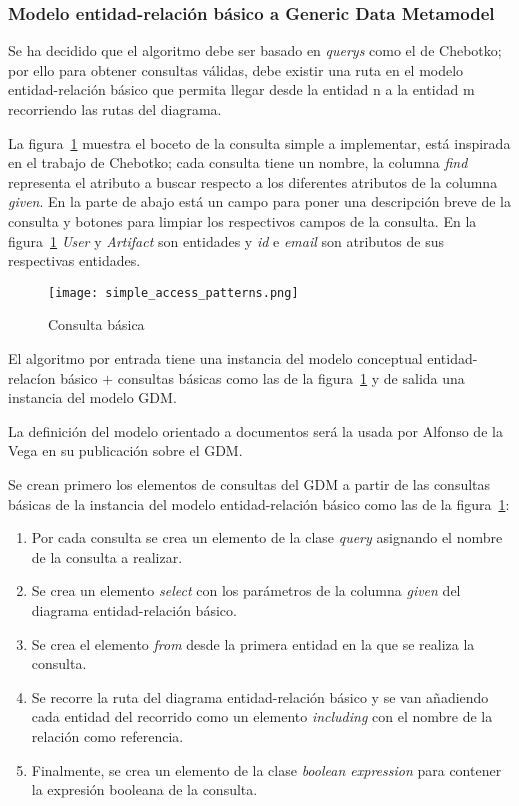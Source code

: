 \subsubsection{Modelo entidad-relación básico a Generic Data Metamodel}\label{sec:er-to-gdm}

Se ha decidido que el algoritmo debe ser basado en \textit{querys} como el de Chebotko; por ello para obtener consultas válidas, debe existir una ruta en el modelo entidad-relación básico que permita llegar desde la entidad n a la entidad m recorriendo las rutas del diagrama.


La figura~\ref{img:simple-access-pattern} muestra el boceto de la consulta simple a implementar, está inspirada en el trabajo de Chebotko; cada consulta tiene un nombre, la columna \textit{find} representa el atributo a buscar respecto a los diferentes atributos de la columna \textit{given}. En la parte de abajo está un campo para poner una descripción breve de la consulta y botones para limpiar los respectivos campos de la consulta. En la figura~\ref{img:simple-access-pattern} \textit{User} y \textit{Artifact} son entidades y \textit{id} e \textit{email} son atributos de sus respectivas entidades.


\begin{figure}[H] 
    \centering
    \texttt{[image: simple\_access\_patterns.png]}
    \caption{Consulta básica}
    \label{img:simple-access-pattern}
\end{figure}


El algoritmo por entrada tiene una instancia del modelo conceptual entidad-relacíon básico $+$ consultas básicas como las de la figura~\ref{img:simple-access-pattern} y de salida una instancia del modelo GDM.


La definición del modelo orientado a documentos será la usada por Alfonso de la Vega en su publicación sobre el GDM.


Se crean primero los elementos de consultas del GDM a partir de las consultas básicas de la instancia del modelo entidad-relación básico como las de la figura~\ref{img:simple-access-pattern}:


\begin{enumerate}
    \item Por cada consulta se crea un elemento de la clase \textit{query} asignando el nombre de la consulta a realizar.
    \item Se crea un elemento \textit{select} con los parámetros de la columna \textit{given} del diagrama entidad-relación básico.
    \item Se crea el elemento \textit{from} desde la primera entidad en la que se realiza la consulta.
    \item Se recorre la ruta del diagrama entidad-relación básico y se van añadiendo cada entidad del recorrido como un elemento \textit{including} con el nombre de la relación como referencia.
    \item Finalmente, se crea un elemento de la clase \textit{boolean expression} para contener la expresión booleana de la consulta.
\end{enumerate}


